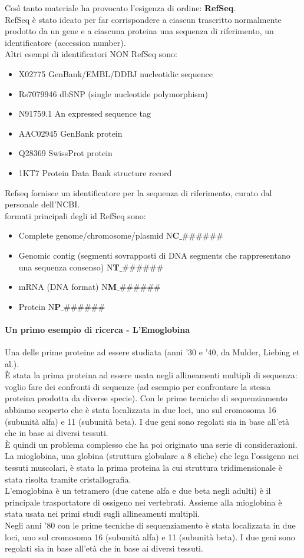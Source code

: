 \documentclass{article}
\begin{document}
Così tanto materiale ha provocato l'esigenza di ordine: \textbf{RefSeq}.\\
RefSeq è stato ideato per far corrispondere a ciascun trascritto
normalmente prodotto da un gene e a ciascuna proteina una sequenza di
riferimento, un identificatore (accession number).\\
Altri esempi di identificatori NON RefSeq sono:
\begin{itemize}
    \item X02775 GenBank/EMBL/DDBJ nucleotidic sequence
    \item Rs7079946 dbSNP (single nucleotide polymorphism)
    \item N91759.1 An expressed sequence tag
    \item AAC02945 GenBank protein
    \item Q28369 SwissProt protein
    \item 1KT7 Protein Data Bank structure record
\end{itemize}
Refseq fornisce un identificatore per la sequenza di riferimento, curato dal
personale dell'NCBI.\\
formati principali degli id RefSeq sono:
\begin{itemize}
    \item Complete genome/chromosome/plasmid N\textbf{C}$\_\#\#\#\#\#\#$
    \item Genomic contig (segmenti sovrapposti di DNA segments che rappresentano una sequenza consenso) N\textbf{T}$\_\#\#\#\#\#\#$
    \item mRNA (DNA format) N\textbf{M}$\_\#\#\#\#\#\#$
    \item Protein N\textbf{P}$\_\#\#\#\#\#\#$
\end{itemize}
\paragraph{Un primo esempio di ricerca - L'Emoglobina}
Una delle prime proteine ad essere studiata (anni '30 e '40, da Mulder, Liebing et al.).\\
È stata la prima proteina ad essere usata negli allineamenti multipli di sequenza:
voglio fare dei confronti di sequenze (ad esempio per confrontare la stessa proteina prodotta da diverse specie). Con le prime tecniche di sequenziamento abbiamo scoperto che è stata localizzata in due loci, uno sul cromosoma 16 (subunità alfa) e 11 (subunità beta). I due geni sono regolati sia in base all'età che in base ai diversi tessuti.\\
È quindi un problema complesso che ha poi originato una serie di considerazioni.
La mioglobina, una globina (struttura globulare a 8 eliche)
che lega l'ossigeno nei tessuti muscolari, è stata la prima
proteina la cui struttura tridimensionale è stata risolta
tramite cristallografia.\\
L'emoglobina è un tetramero (due catene alfa e due beta negli
adulti) è il principale trasportatore di ossigeno nei vertebrati.
Assieme alla mioglobina è stata usata nei primi studi sugli
allineamenti multipli.\\
Negli anni '80 con le prime tecniche di sequenziamento è stata
localizzata in due loci, uno sul cromosoma 16 (subunità alfa) e 11
(subunità beta). I due geni sono regolati sia in base all'età che in
base ai diversi tessuti.
\end{document}
